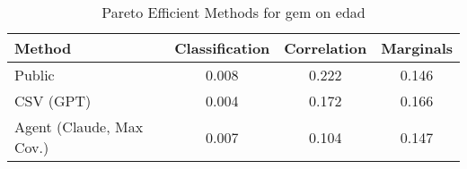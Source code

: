 \begin{table}[t!]
    \centering
    \caption{Pareto Efficient Methods for gem on edad}
    \label{tab:pareto_efficient_methods_gem_edad}
    \begin{tabular}{lccc}
    \toprule
    Method & Classification & Correlation & Marginals \\
    \midrule
    Public & \cellcolor{bronze!30}0.008 & \cellcolor{bronze!30}0.222 & \cellcolor{gold!30}0.146 \\
    CSV (GPT) & \cellcolor{gold!30}0.004 & \cellcolor{silver!30}0.172 & \cellcolor{bronze!30}0.166 \\
    Agent (Claude, Max Cov.) & \cellcolor{silver!30}0.007 & \cellcolor{gold!30}0.104 & \cellcolor{silver!30}0.147 \\
    \bottomrule
    \end{tabular}
\end{table}